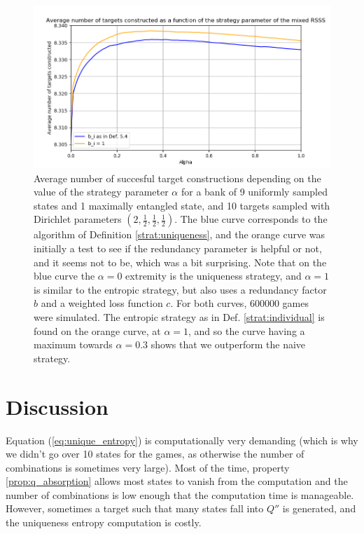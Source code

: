 \begin{figure}[h!]
    \centering
    \includegraphics[scale=0.7]{images/locc_comparison.png}
    \caption{Average number of succesful target constructions depending on the value of the strategy parameter $\alpha$ for a bank of 9 uniformly sampled states and 1 maximally entangled state, and 10 targets sampled with Dirichlet parameters $\left(2, \frac{1}{2}, \frac{1}{2}, \frac{1}{2}\right)$. The blue curve corresponds to the algorithm of Definition \ref{strat:uniqueness}, and the orange curve was initially a test to see if the redundancy parameter is helpful or not, and it seems not to be, which was a bit surprising. Note that on the blue curve the $\alpha = 0$ extremity is the uniqueness strategy, and $\alpha = 1$ is similar to the entropic strategy, but also uses a redundancy factor $b$ and a weighted loss function $c$. For both curves, 600000 games were simulated. The entropic strategy as in Def. \ref{strat:individual} is found on the orange curve, at $\alpha = 1$, and so the curve having a maximum towards $\alpha = 0.3$ shows that we outperform the naive strategy.}
    \label{fig:strategy_comparison}
\end{figure}

\section{Discussion} \label{sec:strategies_discussion}

Equation (\ref{eq:unique_entropy}) is computationally very demanding (which is why we didn't go over 10 states for the games, as otherwise the number of combinations is sometimes very large). Most of the time, property \ref{prop:q_absorption} allows most states to vanish from the computation and the number of combinations is low enough that the computation time is manageable. However, sometimes a target such that many states fall into $Q''$ is generated, and the uniqueness entropy computation is costly.

